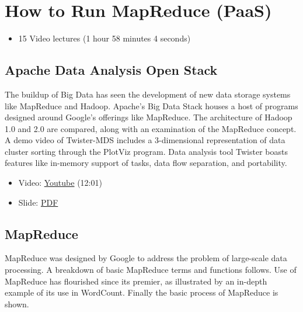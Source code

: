 \FILENAME


\section{How to Run MapReduce (PaaS)}\label{how-to-run-mapreduce-paas}

\begin{itemize}
\tightlist
\item
  15 Video lectures (1 hour 58 minutes 4 seconds)
\end{itemize}

\subsection{Apache Data Analysis Open
Stack}\label{apache-data-analysis-open-stack}

The buildup of Big Data has seen the development of new data storage
systems like MapReduce and Hadoop. Apache's Big Data Stack houses a host
of programs designed around Google's offerings like MapReduce. The
architecture of Hadoop 1.0 and 2.0 are compared, along with an
examination of the MapReduce concept. A demo video of Twister-MDS
includes a 3-dimensional representation of data cluster sorting through
the PlotViz program. Data analysis tool Twister boasts features like
in-memory support of tasks, data flow separation, and portability.

\begin{itemize}
\tightlist
\item
  Video: \href{https://www.youtube.com/watch?v=6vkgvGtyv4Q}{Youtube}
  (12:01)
\end{itemize}

\begin{itemize}
\tightlist
\item
  Slide:
  \href{https://drive.google.com/open?id=0B88HKpainTSfMnpCelpNQUpNdVE}{PDF}
\end{itemize}

\subsection{MapReduce}\label{mapreduce}

MapReduce was designed by Google to address the problem of large-scale
data processing. A breakdown of basic MapReduce terms and functions
follows. Use of MapReduce has flourished since its premier, as
illustrated by an in-depth example of its use in WordCount. Finally the
basic process of MapReduce is shown.

